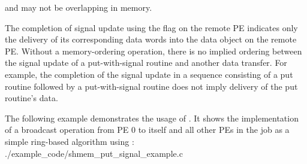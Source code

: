 \begin{apidefinition}
{     and \dest{} may not be overlapping in memory.

    The completion of signal update using the  flag on the remote
    \ac{PE} indicates only the delivery of its corresponding \dest{} data words
    into the data object on the remote \ac{PE}. Without a memory-ordering
    operation, there is no implied ordering between the signal update of a
    put-with-signal routine and another data transfer. For example, the
    completion of the signal update in a sequence consisting of a put routine
    followed by a put-with-signal routine does not imply delivery of the put
    routine's data.
}

\begin{apiexamples}

\apicexample
    {The following example demonstrates the usage of .
    It shows the implementation of a broadcast operation from \ac{PE} 0 to
    itself and all other \acp{PE} in the job as a simple ring-based algorithm
    using :}
    {./example_code/shmem_put_signal_example.c}
    {}
\end{apiexamples}

\end{apidefinition}
\color{black}
